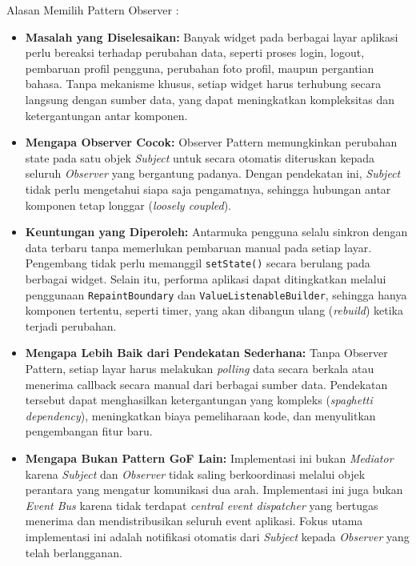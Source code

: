 \documentclass[11pt]{article}
\begin{document}
Alasan Memilih Pattern Observer :
\begin{itemize}

\item \textbf{Masalah yang Diselesaikan:} Banyak widget pada berbagai layar aplikasi perlu bereaksi terhadap perubahan data, seperti proses login, logout, pembaruan profil pengguna, perubahan foto profil, maupun pergantian bahasa. Tanpa mekanisme khusus, setiap widget harus terhubung secara langsung dengan sumber data, yang dapat meningkatkan kompleksitas dan ketergantungan antar komponen.

\item \textbf{Mengapa Observer Cocok:} Observer Pattern memungkinkan perubahan state pada satu objek \textit{Subject} untuk secara otomatis diteruskan kepada seluruh \textit{Observer} yang bergantung padanya. Dengan pendekatan ini, \textit{Subject} tidak perlu mengetahui siapa saja pengamatnya, sehingga hubungan antar komponen tetap longgar (\textit{loosely coupled}).

\item \textbf{Keuntungan yang Diperoleh:} Antarmuka pengguna selalu sinkron dengan data terbaru tanpa memerlukan pembaruan manual pada setiap layar. Pengembang tidak perlu memanggil \texttt{setState()} secara berulang pada berbagai widget. Selain itu, performa aplikasi dapat ditingkatkan melalui penggunaan \texttt{RepaintBoundary} dan \texttt{ValueListenableBuilder}, sehingga hanya komponen tertentu, seperti timer, yang akan dibangun ulang (\textit{rebuild}) ketika terjadi perubahan.

\item \textbf{Mengapa Lebih Baik dari Pendekatan Sederhana:} Tanpa Observer Pattern, setiap layar harus melakukan \textit{polling} data secara berkala atau menerima callback secara manual dari berbagai sumber data. Pendekatan tersebut dapat menghasilkan ketergantungan yang kompleks (\textit{spaghetti dependency}), meningkatkan biaya pemeliharaan kode, dan menyulitkan pengembangan fitur baru.

\item \textbf{Mengapa Bukan Pattern GoF Lain:} Implementasi ini bukan \textit{Mediator} karena \textit{Subject} dan \textit{Observer} tidak saling berkoordinasi melalui objek perantara yang mengatur komunikasi dua arah. Implementasi ini juga bukan \textit{Event Bus} karena tidak terdapat \textit{central event dispatcher} yang bertugas menerima dan mendistribusikan seluruh event aplikasi. Fokus utama implementasi ini adalah notifikasi otomatis dari \textit{Subject} kepada \textit{Observer} yang telah berlangganan.

\end{itemize}
\end{document}
